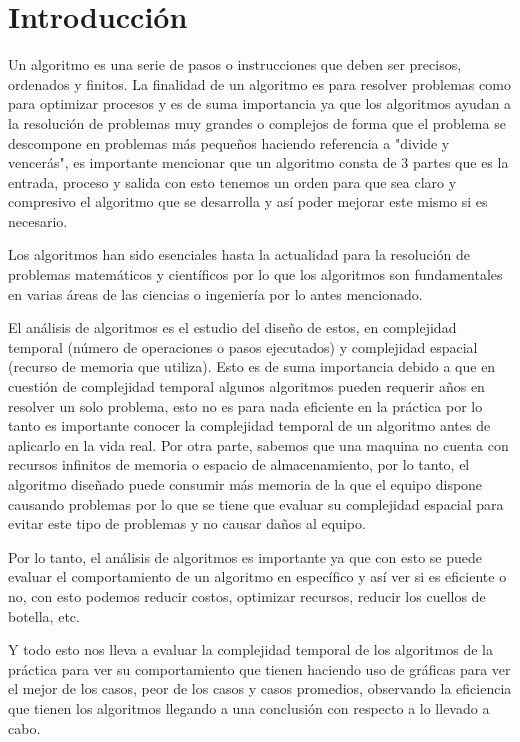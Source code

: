 \documentclass[12pt,twoside]{article}
\begin{document}
\section{Introducci\'on}
Un algoritmo es una serie de pasos o instrucciones que deben ser precisos, ordenados y finitos. La finalidad de un algoritmo es para resolver problemas como para optimizar procesos y es de suma importancia ya que los algoritmos ayudan a la resolución de problemas muy grandes o complejos de forma que el problema se descompone en problemas más pequeños haciendo referencia a "divide y vencerás", es importante mencionar que un algoritmo consta de 3 partes que es la entrada, proceso y salida con esto tenemos un orden para que sea claro y compresivo el algoritmo que se desarrolla y así poder mejorar este mismo si es necesario.
\par
Los algoritmos han sido esenciales hasta la actualidad para la resolución de problemas 
matemáticos y científicos por lo que los algoritmos son fundamentales en varias áreas de las ciencias o ingeniería por lo antes mencionado. 
\medskip

El análisis de algoritmos es el estudio del diseño de estos, en complejidad temporal (número de operaciones o pasos ejecutados) y complejidad espacial (recurso de memoria que utiliza). Esto es de suma importancia debido a que en cuestión de complejidad temporal algunos algoritmos pueden requerir años en resolver un solo problema, esto no es para nada eficiente en la práctica por lo tanto es importante conocer la complejidad temporal de un algoritmo antes de aplicarlo en la vida real. Por otra parte, sabemos que una maquina no cuenta con recursos infinitos de memoria o espacio de almacenamiento, por lo tanto, el algoritmo diseñado puede consumir más memoria de la que el equipo dispone causando problemas por lo que se tiene que evaluar su complejidad espacial para evitar este tipo de problemas y no causar daños al equipo. 

Por lo tanto, el análisis de algoritmos es importante ya que con esto se puede evaluar el comportamiento de un algoritmo en específico y así ver si es eficiente o no, con esto podemos reducir costos, optimizar recursos, reducir los cuellos de botella, etc. 
\medskip

Y todo esto nos lleva a evaluar la complejidad temporal de los algoritmos de la práctica para ver su comportamiento que tienen haciendo uso de gráficas para ver el mejor de los casos, peor de los casos y casos promedios, observando la eficiencia que tienen los algoritmos llegando a una conclusión con respecto a lo llevado a cabo.
\end{document}
